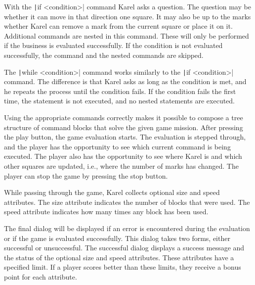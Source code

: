 With the \texttt|if <condition>| command Karel asks a question.
The question may be whether it can move in that direction one square.
It may also be up to the marks whether Karel can remove a mark from the current square or place it on it.
Additional commands are nested in this command.
These will only be performed if the business is evaluated successfully.
If the condition is not evaluated successfully, the command and the nested commands are skipped.

The \texttt|while <condition>| command works similarly to the \texttt|if <condition>| command.
The difference is that Karel asks as long as the condition is met, and he repeats the process until the condition fails.
If the condition fails the first time, the statement is not executed, and no nested statements are executed.

Using the appropriate commands correctly makes it possible to compose a tree structure of command blocks that solve the given game mission.
After pressing the play button, the game evaluation starts.
The evaluation is stepped through, and the player has the opportunity to see which current command is being executed.
The player also has the opportunity to see where Karel is and which other squares are updated, i.e., where the number of marks has changed.
The player can stop the game by pressing the stop button. 

While passing through the game, Karel collects optional size and speed attributes.
The size attribute indicates the number of blocks that were used.
The speed attribute indicates how many times any block has been used.

The final dialog will be displayed if an error is encountered during the evaluation or if the game is evaluated successfully.
This dialog takes two forms, either successful or unsuccessful.
The successful dialog displays a success message and the status of the optional size and speed attributes.
These attributes have a specified limit.
If a player scores better than these limits, they receive a bonus point for each attribute.